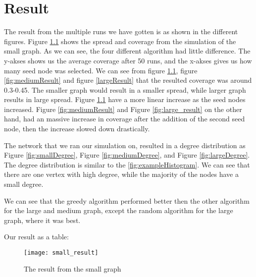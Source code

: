 \chapter{Result}\label{result}
The result from the multiple runs we have gotten is as shown in the different figures. Figure \ref{fig:smallResult} shows the spread and coverage from the simulation of the small graph. As we can see, the four different algorithm had little difference. The y-akses shows us the average coverage after 50 runs, and the x-akses gives us how many seed node was selected. We can see from figure \ref{fig:smallResult}, figure \ref{fig:mediumResult} and figure \ref{largeResult} that the resulted coverage was around 0.3-0.45. The smaller graph would result in a smaller spread, while larger graph results in large spread. Figure \ref{fig:smallResult} have a more linear increase as the seed nodes increased. Figure \ref{fig:mediumResult} and Figure \ref{fig:large_result} on the other hand, had an massive increase in coverage after the addition of the second seed node, then the increase slowed down drastically. 

The network that we ran our simulation on, resulted in a degree distribution as Figure \ref{fig:smallDegree}, Figure \ref{fig:mediumDegree}, and Figure \ref{fig:largeDegree}. The degree distribution is similar to the \ref{fig:exampleHistogram}. We can see that there are one vertex with high degree, while the majority of the nodes have a small degree. 


We can see that the greedy algorithm performed better then the other algorithm for the large and medium graph, except the random algorithm for the large graph, where it was best.


Our result as a table:

\begin{figure}[t]
	\texttt{[image: small\_result]}
	\caption{The result from the small graph} 
	\label{fig:smallResult}
\end{figure}

